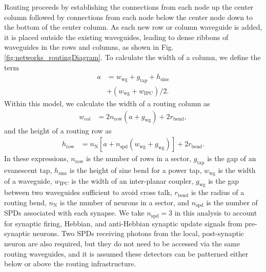 \documentclass[twocolumn]{article}
\begin{document}
Routing proceeds by establishing the connections from each node up the center column followed by connections from each node below the center node down to the bottom of the center column. As each new row or column waveguide is added, it is placed outside the existing waveguides, leading to dense ribbons of waveguides in the rows and columns, as shown in Fig. \ref{fig:networks_routingDiagram}. To calculate the width of a column, we define the term
\begin{equation}
\label{eq:a}
\begin{split}
a & = w_{\mathrm{wg}}+g_{\mathrm{tap}}+h_{\mathrm{sine}} \\
& +(w_{\mathrm{wg}}+w_{\mathrm{IPC}})/2.
\end{split}
\end{equation}
Within this model, we calculate the width of a routing column as
\begin{equation}
\label{eq:wCol}
\begin{split}
w_{\mathrm{col}} &= 2 n_{\mathrm{row}}(a+g_{\mathrm{wg}})+2r_{\mathrm{bend}},
\end{split}
\end{equation}
and the height of a routing row as
\begin{equation}
\label{eq:hRow}
\begin{split}
h_{\mathrm{row}} &= n_{\mathrm{N}}\left[a+n_{\mathrm{spd}}(w_{\mathrm{wg}}+g_{\mathrm{wg}})\right]+2r_{\mathrm{bend}}.
\end{split}
\end{equation}
In these expressions, $n_{\mathrm{row}}$ is the number of rows in a sector, $g_{\mathrm{tap}}$ is the gap of an evanescent tap, $h_{\mathrm{sine}}$ is the height of sine bend for a power tap, $w_{\mathrm{wg}}$ is the width of a waveguide, $w_{\mathrm{IPC}}$ is the width of an inter-planar coupler, $g_{\mathrm{wg}}$ is the gap between two waveguides sufficient to avoid cross talk, $r_{\mathrm{bend}}$ is the radius of a routing bend, $n_{\mathrm{N}}$ is the number of neurons in a sector, and $n_{\mathrm{spd}}$ is the number of SPDs associated with each synapse. We take $n_{\mathrm{spd}}=3$ in this analysis to account for synaptic firing, Hebbian, and anti-Hebbian synaptic update signals from pre-synaptic neurons. Two SPDs receiving photons from the local, post-synaptic neuron are also required, but they do not need to be accessed via the same routing waveguides, and it is assumed these detectors can be patterned either below or above the routing infrastructure. 
\end{document}
